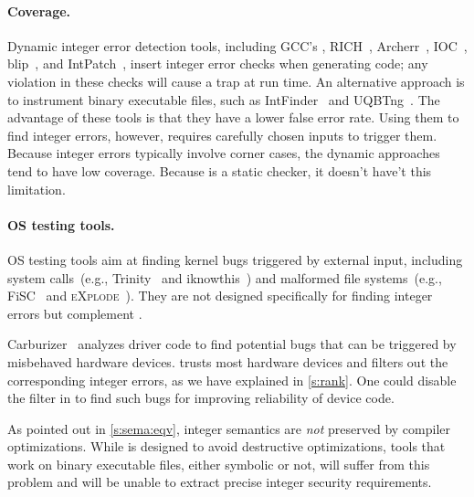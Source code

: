\paragraph{Coverage.}
Dynamic integer error detection tools,
including
GCC's ,
RICH~\cite{brumley:rich},
Archerr~\cite{archerr},
IOC~\cite{ioc},
blip~\cite{blip},
and
IntPatch~\cite{intpatch},
insert integer error checks when generating code; any violation in
these checks will cause a trap at run time.
%
%
An alternative approach is to instrument binary executable files,
such as IntFinder~\cite{intfinder} and UQBTng~\cite{uqbtng}.
%
The advantage of these tools is that they have a lower false error rate.  Using
them to find integer errors, however, requires carefully chosen inputs to
trigger them.  Because integer errors typically involve corner cases, the
dynamic approaches tend to have low coverage.  Because \sys is a static checker,
it doesn't have't this limitation.

\paragraph{OS testing tools.}
OS testing tools aim at finding kernel bugs triggered by external input,
including system calls~(e.g., Trinity~\cite{trinity} and
iknowthis~\cite{iknowthis}) and malformed file systems~(e.g.,
FiSC~\cite{fisc:yang} and \textsc{eXplode}~\cite{explode:yang}).
They are not designed specifically for finding integer errors
but complement \sys.
\fi

Carburizer~\cite{kadav:tolerating} analyzes driver code to find
potential bugs that can be triggered by misbehaved hardware devices.
\sys trusts most hardware devices and filters out the corresponding
integer errors, as we have explained in \autoref{s:rank}.  One could
disable the filter in \sys to find such bugs for improving reliability
of device code.
\fi

As pointed out in \autoref{s:sema:eqv}, integer semantics
are \emph{not} preserved by compiler optimizations.
While \sys is designed to avoid destructive optimizations, tools that
work on binary executable files, either symbolic or not,
will suffer from this problem and will be unable to extract
precise integer security requirements.
\fi

